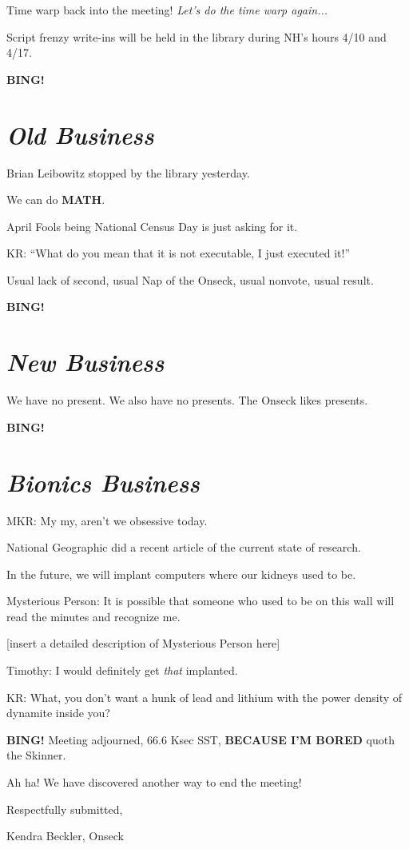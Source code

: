 \documentclass[10pt]{article}
\newcommand{\bing}{{\bf BING!} }
\newcommand{\goto}[1]{\bing \vskip 12pt \section*{{\em{#1}}}}
\newcommand{\onseck}{Kendra Beckler, Onseck}
\begin{document}
Time warp back into the meeting!  \textit{Let's do the time warp again...}

Script frenzy write-ins will be held in the library during NH's hours 4/10 and
4/17.

\goto{Old Business}

Brian Leibowitz stopped by the library yesterday.

We can do \textbf{MATH}.

April Fools being National Census Day is just asking for it.

KR: ``What do you mean that it is not executable, I just executed it!''

Usual lack of second, usual Nap of the Onseck, usual nonvote, usual result.

\goto{New Business}

We have no present.  We also have no presents.  The Onseck likes presents.

\goto{Bionics Business}

MKR: My my, aren't we obsessive today.

National Geographic did a recent article of the current state of research.

In the future, we will implant computers where our kidneys used to be.

Mysterious Person: It is possible that someone who used to be on this wall
will read the minutes and recognize me.

[insert a detailed description of Mysterious Person here]

Timothy: I would definitely get \textit{that} implanted.

KR: What, you don't want a hunk of lead and lithium with the power density of
dynamite inside you?

\bing
\noindent
Meeting adjourned, 66.6 Ksec SST, \textbf{BECAUSE I'M BORED} quoth the Skinner.

Ah ha!  We have discovered another way to end the meeting!

\vspace{18pt}

\centerline{Respectfully submitted,}
\centerline{\onseck}
\end{document}
